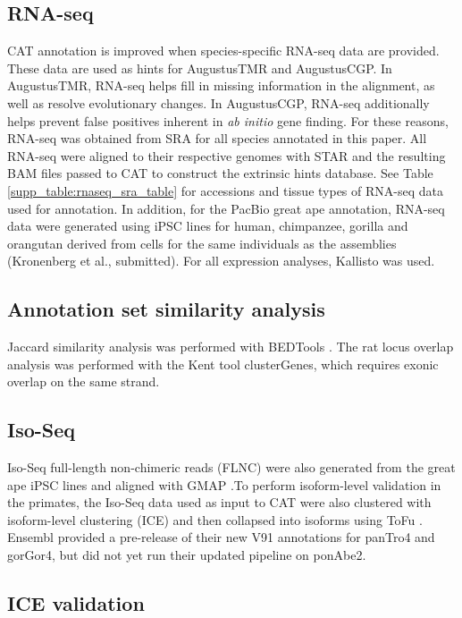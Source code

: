 \documentclass[fleqn,10pt]{wlscirep}
\begin{document}
\subsection*{RNA-seq}

CAT annotation is improved when species-specific RNA-seq data are provided. These data are used as hints for AugustusTMR and AugustusCGP. In AugustusTMR, RNA-seq helps fill in missing information in the alignment, as well as resolve evolutionary changes. In AugustusCGP, RNA-seq additionally helps prevent false positives inherent in \textit{ab initio} gene finding. For these reasons, RNA-seq was obtained from SRA for all species annotated in this paper. All RNA-seq were aligned to their respective genomes with STAR \cite{dobin2013star} and the resulting BAM files passed to CAT to construct the extrinsic hints database. See Table \ref{supp_table:rnaseq_sra_table} for accessions and tissue types of RNA-seq data used for annotation. In addition, for the PacBio great ape annotation, RNA-seq data were generated using iPSC lines for human, chimpanzee, gorilla and orangutan derived from cells for the same individuals as the assemblies (Kronenberg et al., submitted). For all expression analyses, Kallisto \cite{bray2015near} was used.

\subsection*{Annotation set similarity analysis}

Jaccard similarity analysis was performed with BEDTools \cite{quinlan2010bedtools}. The rat locus overlap analysis was performed with the Kent tool clusterGenes, which requires exonic overlap on the same strand.

\subsection*{Iso-Seq}

Iso-Seq full-length non-chimeric reads (FLNC) were also generated from the great ape iPSC lines and aligned with GMAP \cite{wu2005gmap}.To perform isoform-level validation in the primates, the Iso-Seq data used as input to CAT were also clustered with isoform-level clustering (ICE) and then collapsed into isoforms using ToFu \cite{gordon2015widespread}. Ensembl provided a pre-release of their new V91 annotations for panTro4 and gorGor4, but did not yet run their updated pipeline on ponAbe2.

\subsection*{ICE validation}
\end{document}
